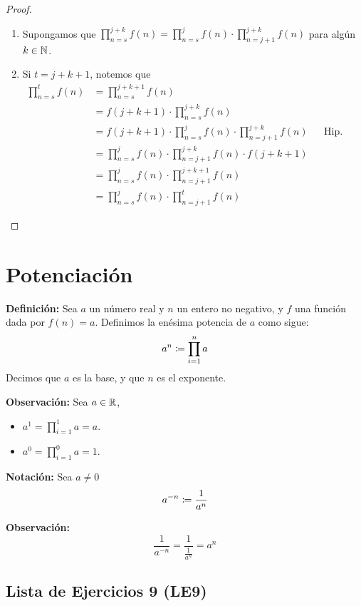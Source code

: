 \begin{enumerate}[label=\alph*)]
\begin{proof}
\begin{enumerate}[label=\Roman*)]
\begin{enumerate}[label=\roman*)]
          \item Supongamos que $\prod_{n=s}^{j+k} f(n) = \prod_{n=s}^{j} f(n) \cdot \prod_{n=j+1}^{j+k} f(n)$ para algún $k\in \mathbb{N}$.
          \item Si $t=j+k+1$, notemos que
          \begin{align*}
            \prod_{n=s}^{t} f(n) &= \prod_{n=s}^{j+k+1} f(n)\\
            &= f(j+k+1) \cdot \prod_{n=s}^{j+k} f(n)\\
            &= f(j+k+1) \cdot \prod_{n=s}^{j} f(n) \cdot \prod_{n=j+1}^{j+k} f(n)&& \text{Hip. Ind.}\\
            &= \prod_{n=s}^{j} f(n) \cdot \prod_{n=j+1}^{j+k} f(n) \cdot f(j+k+1)\\
            &= \prod_{n=s}^{j} f(n) \cdot \prod_{n=j+1}^{j+k+1} f(n)\\
            &= \prod_{n=s}^{j} f(n) \cdot \prod_{n=j+1}^{t} f(n)
          \end{align*}
        \end{enumerate}
      \end{enumerate}
    \end{proof}
    
\end{enumerate}

\section*{Potenciación}

\textbf{Definición:} Sea $a$ un número real y $n$ un entero no negativo, y $f$ una función dada por $f(n)=a$. Definimos la enésima potencia de $a$ como sigue:
\[a^n \coloneqq \prod_{i=1}^{n} a\]
Decimos que $a$ es la base, y que $n$ es el exponente.

\textbf{Observación:} Sea $a\in \mathbb{R}$,
\begin{itemize}
  \item $a^1= \prod_{i=1}^{1} a = a$.
  \item $a^0 = \prod_{i=1}^{0} a = 1$.%
\end{itemize}

\textbf{Notación:} Sea $a\neq 0$ \[a^{-n}\coloneqq \frac{1}{a^n}\]

\textbf{Observación:} \[\frac{1}{a^{-n}} = \frac{1}{\frac{1}{a^n}} = a^n\]

\subsection*{Lista de Ejercicios 9 (LE9)}

